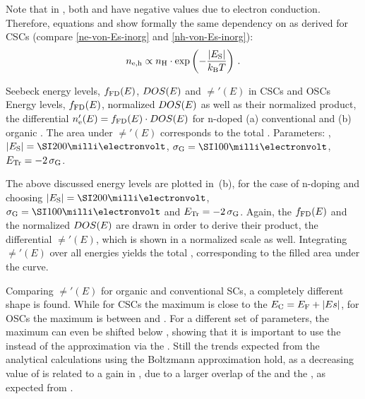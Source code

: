 Note that in \lasteqn[1], both \Es and \Et have negative values due to electron conduction. Therefore, equations \lasteq[1] and \lasteq[0] show formally the same dependency on \Es as derived for CSCs (compare \eqref{ne-von-Es-inorg} and \eqref{nh-von-Es-inorg}):
\begin{equation}\label{eq:n-von-Es-org-prop} %
\n_\text{e,h} \propto \nH \cdot \exp{-\frac{|\Es|}{\kT} }
\PUNKT
\end{equation}

{Seebeck energy levels, $f_\text{FD}(E)$, $DOS(E)$ and $\ne'(E)$ in CSCs and OSCs}
{Energy levels, \fFDLong $f_\text{FD}(E)$, normalized \dosLong $DOS(E)$ as well as their normalized product, the differential \neLong $n_\text{e}'(E)=f_\text{FD}(E) \cdot DOS(E)$ for n-doped (a) conventional and (b) organic \SCs.
The area under $\ne'(E)$ corresponds to the total \neLong \ne. Parameters: \T[25], $|\Es|=\meV{200}$, $\gausswidth=\meV{100}$, $\Et=-2\,\gausswidth$.
}

The above discussed energy levels are plotted in \,(b), for the case of n-doping and choosing $|\Es|=\meV{200}$, $\gausswidth=\meV{100}$ and $\Et=-2\,\gausswidth$. Again, the \fFDLong $f_\text{FD}(E)$ and the normalized \dosLong $DOS(E)$ are drawn in order to derive their product, the differential \neLong $\ne'(E)$, which is shown in a normalized scale as well. Integrating $\ne'(E)$ over all energies yields the total \neLong \ne, corresponding to the filled area under the curve.

Comparing $\ne'(E)$ for organic and conventional SCs, a completely different shape is found. While for CSCs the maximum is close to the \EcLong $E_\text{C}=E_\text{F}+|Es|$, for OSCs the maximum is between \Ef and \Et. For a different set of parameters, the maximum can even be shifted below \Ef, showing that it is important to use the \fFDLong instead of the approximation via the \fBLong. Still the trends expected from the analytical calculations using the Boltzmann approximation hold, as a decreasing value of \Es is related to a gain in \ne, due to a larger overlap of the \dos and the \fFD, as expected from \CSCs.

